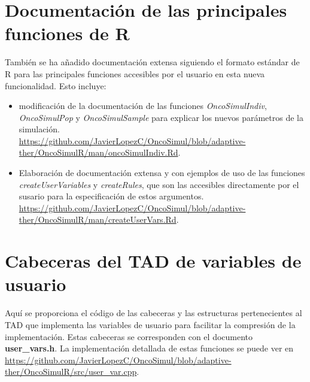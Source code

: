 \chapter{Documentación de las principales funciones de R \label{sec:docum}}\label{B}

También se ha añadido documentación extensa siguiendo el formato estándar de R para las principales funciones accesibles por el usuario en esta nueva funcionalidad. Esto incluye:

\begin{itemize}
	\item modificación de la documentación de las funciones \textit{OncoSimulIndiv}, \textit{OncoSimulPop} y \textit{OncoSimulSample} para explicar los nuevos parámetros de la simulación. \\ \url{https://github.com/JavierLopezC/OncoSimul/blob/adaptive-ther/OncoSimulR/man/oncoSimulIndiv.Rd}.
	\item Elaboración de documentación extensa y con ejemplos de uso de las funciones \textit{createUserVariables} y \textit{createRules}, que son las accesibles directamente por el susario para la especificación de estos argumentos. \\ \url{https://github.com/JavierLopezC/OncoSimul/blob/adaptive-ther/OncoSimulR/man/createUserVars.Rd}.
\end{itemize}


\chapter{Cabeceras del TAD de variables de usuario \label{sec:cabeceras}}\label{C}

Aquí se proporciona el código de las cabeceras y las estructuras pertenecientes al TAD que implementa las variables de usuario para facilitar la compresión de la implementación. Estas cabeceras se corresponden con el documento \textbf{user\_vars.h}. La implementación detallada de estas funciones se puede ver en \url{https://github.com/JavierLopezC/OncoSimul/blob/adaptive-ther/OncoSimulR/src/user_var.cpp}.


